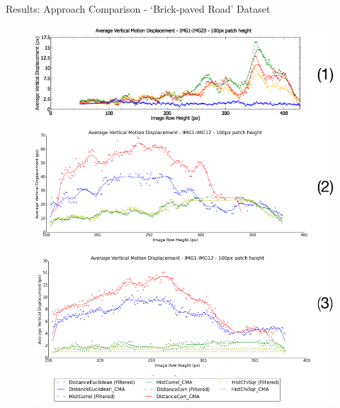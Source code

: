 \documentclass[10pt, compress]{beamer}
\begin{document}
\begin{frame}{Results: Approach Comparison - `Brick-paved Road' Dataset}

\begin{figure}[ht!]
\centering
\vspace{-0.5cm}
\includegraphics[scale=0.145]{outside_pres_results.png}
\end{figure}


%
%
%
%
%

\end{frame}
\end{document}
